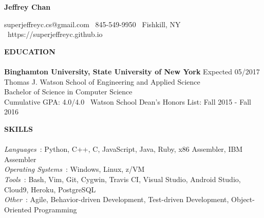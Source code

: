 \documentclass[10.5pt]{res}
\newcommand{\sectionSpace}{\vspace{-3pt}}
\begin{document}
 
\centerline{\LARGE \textbf{Jeffrey Chan}}
{\vspace{1pt}}
\centerline{superjeffreyc.cs@gmail.com \textbar ~845-549-9950 \textbar ~Fishkill, NY \textbar ~https://superjeffreyc.github.io}      
\vspace{-16pt}              
\begin{resume}                   
\textbf{EDUCATION} \\ [-10.5pt]
\noindent\makebox[\linewidth]{\rule{\textwidth}{0.4pt}}\\
\textbf{Binghamton University, State University of New York} \hfill Expected 05/2017 \\
    	Thomas J. Watson School of Engineering and Applied Science \\
	Bachelor of Science in Computer Science \\
	Cumulative GPA: 4.0/4.0 \textbar~Watson School Dean's Honors List: Fall 2015 - Fall 2016 
	\sectionSpace

\textbf{SKILLS} \\ [-10.5pt]
\noindent\makebox[\linewidth]{\rule{\textwidth}{0.4pt}}\\
{\it Languages}~: Python, C++, C, JavaScript, Java, Ruby, x86 Assembler, IBM Assembler \\
{\it Operating Systems}~: Windows, Linux, z/VM \\
{\it Tools}~: Bash, Vim, Git, Cygwin, Travis CI, Visual Studio, Android Studio, Cloud9, Heroku, PostgreSQL \\
{\it Other}~: Agile, Behavior-driven Development, Test-driven Development, Object-Oriented Programming
\sectionSpace


\end{resume}
\end{document}
